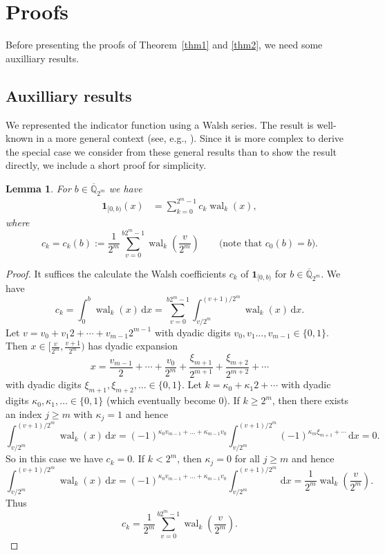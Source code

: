 \documentclass[12pt]{article}
\newtheorem{lemma}[theorem]{Lemma}
\theoremstyle{definition}
\numberwithin{equation}{section}
\newcommand{\rd}{\,\mathrm{d}}
\begin{document}
\section{Proofs}

Before presenting the proofs of Theorem~\ref{thm1} and \ref{thm2}, we need some auxilliary results.


\subsection{Auxilliary results}

We represented the indicator function using a Walsh series. The result is well-known in a more general context (see, e.g., \cite{DKP10,Fine}). Since it is more complex to derive the special case we consider from these general results than to show the result directly, we include a short proof for simplicity.

\begin{lemma}
For $b \in \overline{\mathbb{Q}}_{2^m}$ we have 
\begin{align}
\bm{1}_{[0, b )}(x) & = \sum_{k=0}^{2^{m}-1} c_k \operatorname{wal}_k(x),\label{fine3}
\end{align}
where $$c_k = c_k(b) := \frac{1}{2^{m}} \sum_{v = 0}^{b 2^{m} - 1} \operatorname{wal}_k\left(\frac{v}{2^m}\right) \qquad \text{(note that $c_0(b)=b$).}$$ 
\end{lemma}

\begin{proof}
It suffices the calculate the Walsh coefficients $c_k$ of $\bm{1}_{[0, b )}$ for $b \in \overline{\mathbb{Q}}_{2^m}$. We have
$$c_k=\int_0^b \operatorname{wal}_k(x) \rd x=\sum_{v=0}^{b 2^m-1} \int_{v/2^m}^{(v+1)/2^m}\operatorname{wal}_k(x) \rd x.$$ Let $v=v_0+v_1 2+\cdots+v_{m-1} 2^{m-1}$ with dyadic digits $v_0,v_1\ldots,v_{m-1}\in \{0,1\}$. Then $x \in [\tfrac{v}{2^m},\tfrac{v+1}{2^m})$ has dyadic expansion $$x=\frac{v_{m-1}}{2}+\cdots+\frac{v_0}{2^m}+\frac{\xi_{m+1}}{2^{m+1}}+\frac{\xi_{m+2}}{2^{m+2}}+\cdots$$ with dyadic digits $\xi_{m+1},\xi_{m+2},\ldots \in \{0,1\}$. Let $k=\kappa_0+\kappa_1 2+\cdots$ with dyadic digits $\kappa_0,\kappa_1,\ldots \in \{0,1\}$ (which eventually  become 0). If $k\ge 2^m$, then there exists an index $j \ge m$ with $\kappa_j=1$ and hence $$\int_{v/2^m}^{(v+1)/2^m}\operatorname{wal}_k(x) \rd x = (-1)^{\kappa_0 v_{m-1}+\ldots+\kappa_{m-1} v_0} \int_{v/2^m}^{(v+1)/2^m} (-1)^{\kappa_m \xi_{m+1}+\cdots} \rd x=0.$$ So in this case we have $c_k=0$. If $k < 2^m$, then $\kappa_j=0$ for all $j \ge m$ and hence $$\int_{v/2^m}^{(v+1)/2^m}\operatorname{wal}_k(x) \rd x = (-1)^{\kappa_0 v_{m-1}+\ldots+\kappa_{m-1} v_0} \int_{v/2^m}^{(v+1)/2^m} \rd x=\frac{1}{2^m} \operatorname{wal}_k\left(\frac{v}{2^m}\right).$$ Thus $$c_k=\frac{1}{2^m} \sum_{v=0}^{b 2^m-1} \operatorname{wal}_k\left(\frac{v}{2^m}\right).$$
\end{proof}
\end{document}
